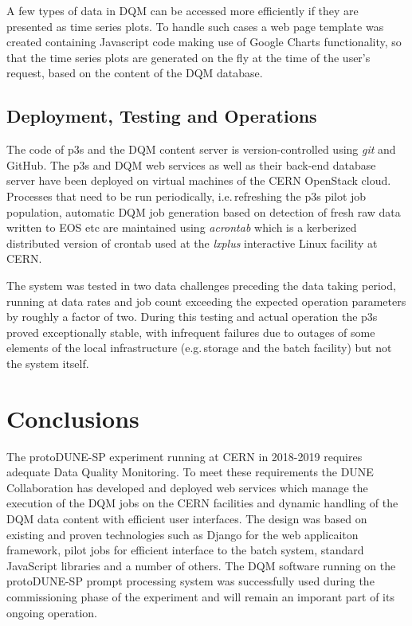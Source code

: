 \documentclass{webofc}
\newcommand{\pd}{protoDUNE\xspace}
\begin{document}
A few types of data in DQM can be accessed more efficiently if they are presented as time
series plots. To handle such cases a web page template was created containing
Javascript code making use of Google Charts functionality, so that the time series
plots are generated on the fly at the time of the user's request, based on the content
of the DQM database.

\subsection{Deployment, Testing and Operations}

The code of p3s and the DQM content server is version-controlled using \textit{git}
and GitHub. The p3s and DQM web services as well as their back-end database server have been deployed on
virtual machines of the CERN OpenStack cloud. Processes that need to be run periodically,
i.e.\,refreshing the p3s pilot job population, automatic DQM job generation based on detection
of fresh raw data written to EOS etc are maintained using \textit{acrontab} which is a kerberized
distributed version of crontab used at the \textit{lxplus} interactive Linux facility at CERN.

The system was tested in two data challenges preceding the data taking period, running
at data rates and job count exceeding the expected operation parameters by roughly
a factor of two. During this testing and actual operation the p3s proved exceptionally stable,
with infrequent failures due to outages of some elements of the local infrastructure
(e.g.\,storage and the batch facility) but not the system itself.

\section{Conclusions}

The \pd-SP experiment running at CERN in 2018-2019 requires adequate Data
Quality Monitoring. To meet these requirements the DUNE Collaboration has developed
and deployed web services which manage the execution of the DQM jobs on the CERN
facilities and dynamic handling of the DQM data content with efficient user interfaces.
The design was based on existing and proven technologies such as Django
for the web applicaiton framework,  pilot jobs for efficient interface to
the batch system, standard  JavaScript libraries and a number of others. The DQM software
running on the \pd-SP prompt processing system was  successfully used during
the commissioning phase of the experiment and will remain an imporant part
of its ongoing operation.
\end{document}
